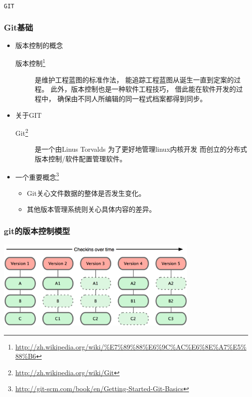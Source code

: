 
\begin{frame}
    \begin{center}
        \LARGE \tt{GIT}
    \end{center}
\end{frame}

\begin{frame}
    \frametitle{Git基础}
    \begin{itemize}    
        \item 版本控制的概念
            \begin{description}
                \item[版本控制\footnote{\url{http://zh.wikipedia.org/wiki/\%E7\%89\%88\%E6\%9C\%AC\%E6\%8E\%A7\%E5\%88\%B6}}] 
                    是维护工程蓝图的标准作法，
                    能追踪工程蓝图从诞生一直到定案的过程。
                    此外，版本控制也是一种软件工程技巧，
                    借此能在软件开发的过程中，
                    确保由不同人所编辑的同一程式档案都得到同步。
            \end{description}
        \item 关于GIT
            \begin{description}
                \item[Git\footnote{\url{http://zh.wikipedia.org/wiki/Git}}] 
                    是一个由Linus Torvalds
                    为了更好地管理linux内核开发
                    而创立的分布式版本控制/软件配置管理软件。
            \end{description}
        \item 一个重要概念\footnote{\url{http://git-scm.com/book/en/Getting-Started-Git-Basics}}
            \begin{itemize}
                \item Git关心文件数据的整体是否发生变化。
                \item 其他版本管理系统则关心具体内容的差异。
            \end{itemize}
    \end{itemize}
\end{frame}

\begin{frame}
    \frametitle{git的版本控制模型}
    \includegraphics[width=10cm,keepaspectratio]{data/GitRevisionModel.png}
\end{frame}

